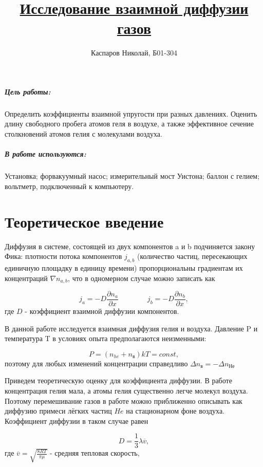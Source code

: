 \documentclass[a4paper]{article}
\title{\underline{Исследование взаимной диффузии газов}}
\author{Каспаров Николай, Б01-304}
\begin{document}
\maketitle

\subparagraph{Цель работы:}
Определить коэффициенты взаимной упругости при разных давлениях.
Оценить длину свободного пробега атомов геля в воздухе,
а также эффективное сечение столкновений атомов гелия с молекулами воздуха.

\subparagraph{В работе используются:}
Установка; форвакуумный насос; измерительный мост Уистона; баллон с гелием; 
вольтметр, подключенный к компьютеру.

\section{Теоретическое введение}

Диффузия в системе, состоящей из двух компонентов a и b
подчиняется закону Фика: плотности потока компонентов $j_{a, b}$
(количество частиц, пересекающих единичную площадку в единицу времени)
пропорциональны градиентам их концентраций $\nabla n_{a, b}$, что в одномерном
случае можно записать как

\begin{equation}
    j_a = -D \frac{\partial n_a}{\partial x} \qquad \qquad j_b = -D \frac{\partial n_b}{\partial x}, 
\end{equation}
где $D$ - коэффициент взаимной диффузии компонентов.

В данной работе исследуется взаимная диффузия гелия и воздуха.
Давление P и температура T в условиях опыта предполагаются неизменными:

\begin{equation}
    P = (n_{he} + n_\text{в})kT = const,
\end{equation}
поэтому для любых изменений концентрации справедливо $\Delta n_\text{в} = - \Delta n_\text{Не}$

Приведем теоретическую оценку для коэффициента диффузии.
В работе концентрация гелия мала, а атомы гелия существенно легче молекул воздуха.
Поэтому перемешивание газов в работе можно приближенно описывать
как диффузию примеси лёгких частиц $He$ на стационарном
фоне воздуха. Коэффициент диффузии в таком случае равен

\begin{equation}
    D = \frac{1}{3} \lambda \overline{v},
\end{equation}
где $\overline{v} = \sqrt{\frac{8RT}{\pi \mu}}$ - средняя тепловая скорость,
\end{document}
